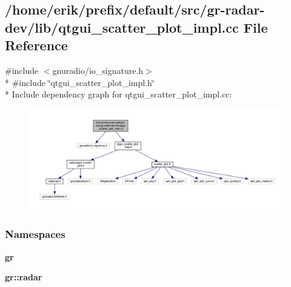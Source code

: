 \subsection{/home/erik/prefix/default/src/gr-\/radar-\/dev/lib/qtgui\+\_\+scatter\+\_\+plot\+\_\+impl.cc File Reference}
\label{qtgui__scatter__plot__impl_8cc}
{\ttfamily \#include $<$gnuradio/io\+\_\+signature.\+h$>$}\\*
{\ttfamily \#include \char`\"{}qtgui\+\_\+scatter\+\_\+plot\+\_\+impl.\+h\char`\"{}}\\*
Include dependency graph for qtgui\+\_\+scatter\+\_\+plot\+\_\+impl.\+cc\+:
\nopagebreak
\begin{figure}[H]
\begin{center}
\leavevmode
\includegraphics[width=350pt]{d1/d10/qtgui__scatter__plot__impl_8cc__incl}
\end{center}
\end{figure}
\subsubsection*{Namespaces}
\begin{DoxyCompactItemize}
\item 
 {\bf gr}
\item 
 {\bf gr\+::radar}
\end{DoxyCompactItemize}
